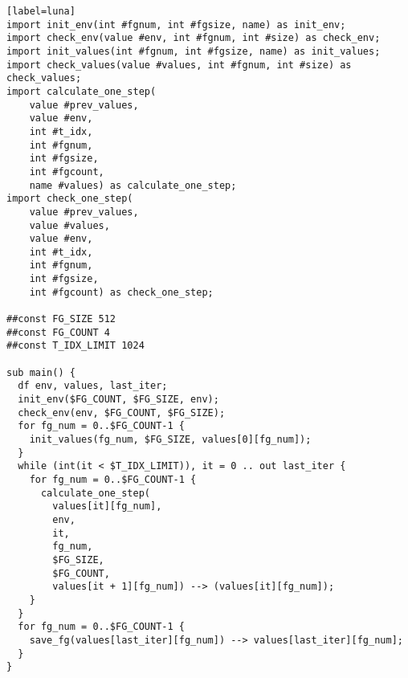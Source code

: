 \vspace*{\fill}
\vspace*{\fill}

\clearpage

\vspace{\baselineskip}

\begin{lstlisting}[style={CppCodeStyle}][label=luna]
import init_env(int #fgnum, int #fgsize, name) as init_env;
import check_env(value #env, int #fgnum, int #size) as check_env;
import init_values(int #fgnum, int #fgsize, name) as init_values;
import check_values(value #values, int #fgnum, int #size) as check_values;
import calculate_one_step(
	value #prev_values,
	value #env,
	int #t_idx,
	int #fgnum,
	int #fgsize,
	int #fgcount,
	name #values) as calculate_one_step;
import check_one_step(
	value #prev_values,
	value #values,
	value #env,
	int #t_idx,
	int #fgnum,
	int #fgsize,
	int #fgcount) as check_one_step;

##const FG_SIZE 512
##const FG_COUNT 4
##const T_IDX_LIMIT 1024

sub main() {
  df env, values, last_iter;
  init_env($FG_COUNT, $FG_SIZE, env);
  check_env(env, $FG_COUNT, $FG_SIZE);
  for fg_num = 0..$FG_COUNT-1 {
    init_values(fg_num, $FG_SIZE, values[0][fg_num]);
  }
  while (int(it < $T_IDX_LIMIT)), it = 0 .. out last_iter {
    for fg_num = 0..$FG_COUNT-1 {
      calculate_one_step(
        values[it][fg_num],
        env,
        it,
        fg_num,
        $FG_SIZE,
        $FG_COUNT,
        values[it + 1][fg_num]) --> (values[it][fg_num]);
    }
  }
  for fg_num = 0..$FG_COUNT-1 {
  	save_fg(values[last_iter][fg_num]) --> values[last_iter][fg_num];
  }
}
\end{lstlisting}

\clearpage